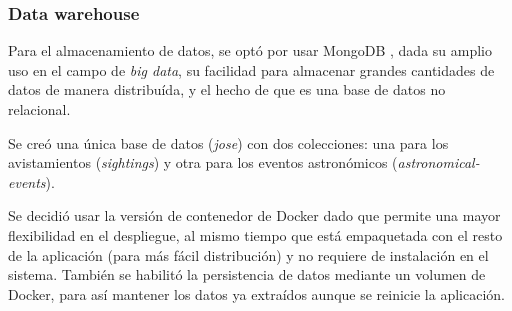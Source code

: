 \subsubsection{Data warehouse}
Para el almacenamiento de datos, se optó por usar MongoDB \cite{mongodb}, dada
su amplio uso en el campo de \textit{big data}, su facilidad para almacenar
grandes cantidades de datos de manera distribuída, y el hecho de que es una base
de datos no relacional.

Se creó una única base de datos (\textit{jose}) con dos colecciones: una para
los avistamientos (\textit{sightings}) y otra para los eventos astronómicos
(\textit{astronomical-events}).

Se decidió usar la versión de contenedor de Docker dado que permite una mayor
flexibilidad en el despliegue, al mismo tiempo que está empaquetada con el resto
de la aplicación (para más fácil distribución) y no requiere de instalación en
el sistema.
También se habilitó la persistencia de datos mediante un volumen de Docker, para
así mantener los datos ya extraídos aunque se reinicie la aplicación.